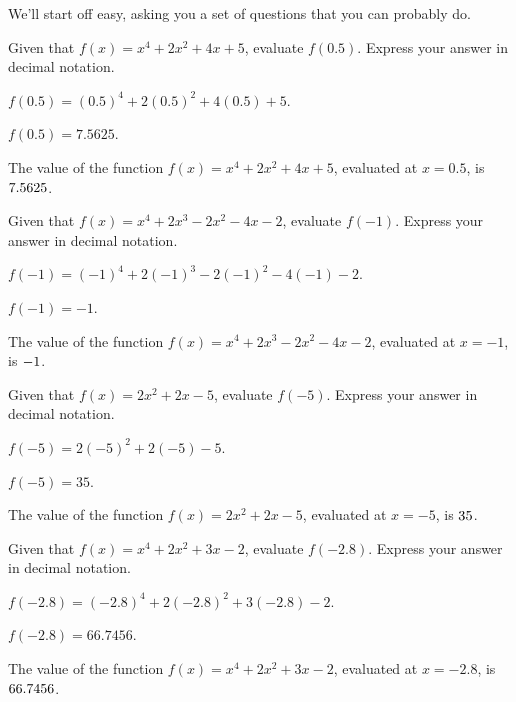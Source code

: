
We'll start off easy, asking you a set of questions that you can
probably do.

\begin{shuffle}
\begin{exercise}
Given that $f(x)=x^4+2 x^2+4 x+5$, evaluate $f(0.5)$. Express your answer in decimal notation.
\begin{solution}
\begin{hint}
$f(0.5)=(0.5)^4+2 (0.5)^2+4 (0.5)+5$.
\end{hint}
\begin{hint}
$f(0.5)=7.5625$.
\end{hint}
The value of the function $f(x) = x^4+2 x^2+4 x+5$, evaluated at $x=0.5$, is ${7.5625}$.
\end{solution}
\end{exercise}

\begin{exercise}
Given that $f(x)=x^4+2 x^3-2 x^2-4 x-2$, evaluate $f(-1)$. Express your answer in decimal notation.
\begin{solution}
\begin{hint}
$f(-1)=(-1)^4+2 (-1)^3-2 (-1)^2-4 (-1)-2$.
\end{hint}
\begin{hint}
$f(-1)=-1$.
\end{hint}
The value of the function $f(x) = x^4+2 x^3-2 x^2-4 x-2$, evaluated at $x=-1$, is ${-1}$.
\end{solution}
\end{exercise}

\begin{exercise}
Given that $f(x)=2 x^2+2 x-5$, evaluate $f(-5)$. Express your answer in decimal notation.
\begin{solution}
\begin{hint}
$f(-5)=2 (-5)^2+2 (-5)-5$.
\end{hint}
\begin{hint}
$f(-5)=35$.
\end{hint}
The value of the function $f(x) = 2 x^2+2 x-5$, evaluated at $x=-5$, is ${35}$.
\end{solution}
\end{exercise}

\begin{exercise}
Given that $f(x)=x^4+2 x^2+3 x-2$, evaluate $f(-2.8)$. Express your answer in decimal notation.
\begin{solution}
\begin{hint}
$f(-2.8)=(-2.8)^4+2 (-2.8)^2+3 (-2.8)-2$.
\end{hint}
\begin{hint}
$f(-2.8)=66.7456$.
\end{hint}
The value of the function $f(x) = x^4+2 x^2+3 x-2$, evaluated at $x=-2.8$, is ${66.7456}$.
\end{solution}
\end{exercise}


\end{shuffle}
